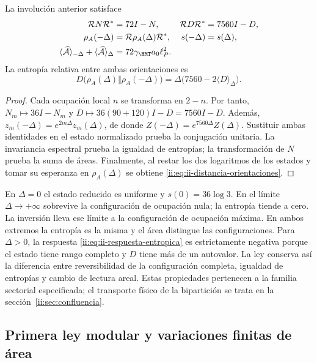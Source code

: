 \begin{theorem}
La involución anterior satisface
\begin{align}
 \mathcal R N\mathcal R^*&=72I-N,&
 \mathcal R D\mathcal R^*&=7560I-D,\\
 \rho_A(-\Delta)&=\mathcal R\rho_A(\Delta)\mathcal R^*,&
 s(-\Delta)&=s(\Delta),
 \label{ii:eq:ii-inversion-entropia}\\
 \langle\widehat{\mathcal A}\rangle_{-\Delta}
 +\langle\widehat{\mathcal A}\rangle_\Delta
 &=72\gamma_{\HMT}a_0\ell_P^2.&&
 \label{ii:eq:ii-area-complementaria}
\end{align}
La entropía relativa entre ambas orientaciones es
\begin{equation}
 D\bigl(\rho_A(\Delta)\Vert\rho_A(-\Delta)\bigr)
 =\Delta\bigl(7560-2\langle D\rangle_\Delta\bigr).
 \label{ii:eq:ii-distancia-orientaciones}
\end{equation}
\end{theorem}
\begin{proof}
Cada ocupación local $n$ se transforma en $2-n$. Por tanto,
$N_m\mapsto36I-N_m$ y
$D\mapsto36(90+120)I-D=7560I-D$.
Además, $z_m(-\Delta)=e^{2m\Delta}z_m(\Delta)$,
de donde $Z(-\Delta)=e^{7560\Delta}Z(\Delta)$.
Sustituir ambas identidades en el estado normalizado prueba la
conjugación unitaria. La invariancia espectral prueba la igualdad
de entropías; la transformación de $N$ prueba la suma de áreas.
Finalmente, al restar los dos logaritmos de los estados y tomar
su esperanza en $\rho_A(\Delta)$ se obtiene
\eqref{ii:eq:ii-distancia-orientaciones}.
\end{proof}

En $\Delta=0$ el estado reducido es uniforme y
$s(0)=36\log3$. En el límite $\Delta\to+\infty$ sobrevive
la configuración de ocupación nula; la entropía tiende a cero.
La inversión lleva ese límite a la configuración de ocupación máxima.
En ambos extremos la entropía es la misma y el área distingue las
configuraciones. Para $\Delta>0$, la respuesta
\eqref{ii:eq:ii-respuesta-entropica} es estrictamente negativa porque
el estado tiene rango completo y $D$ tiene más de un autovalor.
La ley conserva así la diferencia entre reversibilidad de la
configuración completa, igualdad de entropías y cambio de lectura areal.
Estas propiedades pertenecen a la familia sectorial especificada;
el transporte físico de la bipartición se trata en
la sección~\ref{ii:sec:confluencia}.

\subsection{Primera ley modular y variaciones finitas de área}
\label{ii:sec:ii-area-ley-modular}

